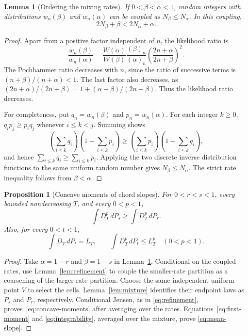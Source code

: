 \documentclass[11pt]{article}
\newtheorem{lemma}[theorem]{Lemma}
\newtheorem{proposition}[theorem]{Proposition}
\theoremstyle{remark}
\newcommand{\dd}{\,d}
\begin{document}
\begin{lemma}[Ordering the mixing rates]\label{lem:rates}
If $0<\beta<\alpha<1$, random integers with distributions
$w_n(\beta)$ and $w_n(\alpha)$ can be coupled as
$N_\beta\leq N_\alpha$. In this coupling,
\[
 2N_\beta+\beta<2N_\alpha+\alpha.
\]
\end{lemma}

\begin{proof}
Apart from a positive factor independent of $n$, the likelihood ratio is
\begin{equation}\label{eq:likelihood}
 \frac{w_n(\beta)}{w_n(\alpha)}
 =\frac{W(\alpha)}{W(\beta)}
   \frac{(\beta)_n}{(\alpha)_n}
   \left(\frac{2n+\alpha}{2n+\beta}\right)^2.
\end{equation}
The Pochhammer ratio decreases with $n$, since the ratio of successive
terms is $(n+\beta)/(n+\alpha)<1$. The last factor also decreases,
as $(2n+\alpha)/(2n+\beta)=1+(\alpha-\beta)/(2n+\beta)$.
Thus the likelihood ratio decreases.

For completeness, put $q_n=w_n(\beta)$ and $p_n=w_n(\alpha)$.
For each integer $k\geq0$, $q_i p_j\geq p_i q_j$ whenever
$i\leq k<j$. Summing shows
\[
 \left(\sum_{i\leq k}q_i\right)\left(1-\sum_{i\leq k}p_i\right)
 \geq
 \left(\sum_{i\leq k}p_i\right)\left(1-\sum_{i\leq k}q_i\right),
\]
and hence $\sum_{i\leq k}q_i\geq\sum_{i\leq k}p_i$.
Applying the two discrete inverse distribution functions to the same
uniform random number gives $N_\beta\leq N_\alpha$.
The strict rate inequality follows from $\beta<\alpha$.
\end{proof}

\begin{proposition}[Concave moments of chord slopes]\label{prop:moments}
For $0<r<s<1$, every bounded nondecreasing $T$, and every $0<p<1$,
\begin{equation}\label{eq:concave-moments}
 \int D_T^p\dd P_s\geq\int D_T^p\dd P_r.
\end{equation}
Also, for every $0<t<1$,
\begin{equation}\label{eq:mean-slope}
 \int D_T\dd P_t=L_T,\qquad
 \int D_T^p\dd P_t\leq L_T^p\quad(0<p<1).
\end{equation}
\end{proposition}

\begin{proof}
Take $\alpha=1-r$ and $\beta=1-s$ in Lemma~\ref{lem:rates}.
Conditional on the coupled rates, use Lemma~\ref{lem:refinement} to
couple the smaller-rate partition as a coarsening of the larger-rate
partition. Choose the same independent uniform point $V$ to select
the cells. Lemma~\ref{lem:mixture} identifies their endpoint laws as
$P_s$ and $P_r$, respectively. Conditional Jensen, as in
\eqref{eq:refinement}, proves~\eqref{eq:concave-moments} after averaging
over the rates. Equations~\eqref{eq:first-moment} and
\eqref{eq:integrability}, averaged over the mixture, prove
\eqref{eq:mean-slope}.
\end{proof}
\end{document}
